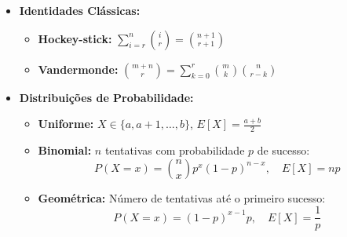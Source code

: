 \begin{small}
\begin{itemize}
    \item \textbf{Identidades Clássicas:}
    \begin{itemize}
        \item \textbf{Hockey-stick:} $\sum_{i=r}^{n} \binom{i}{r} = \binom{n+1}{r+1}$
        \item \textbf{Vandermonde:} $\binom{m+n}{r} = \sum_{k=0}^{r} \binom{m}{k} \binom{n}{r-k}$
    \end{itemize}

    \item \textbf{Distribuições de Probabilidade:}
    \begin{itemize}
        \item \textbf{Uniforme:} $X \in \{a, a+1, \dots, b\}$, $E[X] = \frac{a + b}{2}$
        \item \textbf{Binomial:} $n$ tentativas com probabilidade $p$ de sucesso:
        \[
        P(X = x) = \binom{n}{x} p^x (1 - p)^{n - x}, \quad E[X] = np
        \]
        \item \textbf{Geométrica:} Número de tentativas até o primeiro sucesso:
        \[
        P(X = x) = (1 - p)^{x - 1} p, \quad E[X] = \frac{1}{p}
        \]
    \end{itemize}

\end{itemize}
\end{small}
